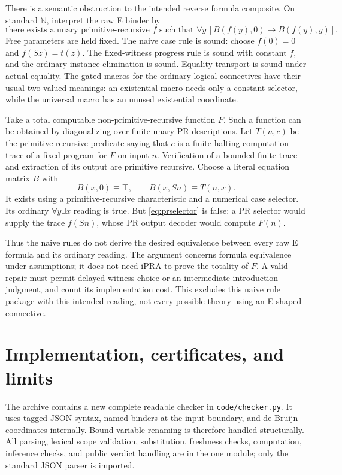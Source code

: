 \documentclass[11pt,letterpaper]{article}
\theoremstyle{definition}\newtheorem{definition}[theorem]{Definition}
\theoremstyle{remark}\newtheorem{remark}[theorem]{Remark}
\newcommand{\file}[1]{{\small\nolinkurl{#1}}}
\begin{document}
There is a semantic obstruction to the intended reverse formula
composite. On standard $\mathbb N$, interpret the raw E binder by
\[
 \text{there exists a unary primitive-recursive }f\text{ such that }
 \forall y\,[B(f(y),0)\to B(f(y),y)].
 \tag{PR-selector reading}\label{eq:prselector}
\]
Free parameters are held fixed. The naive case rule is sound: choose
$f(0)=0$ and $f(Sz)=t(z)$. The fixed-witness progress rule is sound
with constant $f$, and the ordinary instance elimination is sound.
Equality transport is sound under actual equality. The gated macros
for the ordinary logical connectives have their usual two-valued
meanings: an existential macro needs only a constant selector, while
the universal macro has an unused existential coordinate.

Take a total computable non-primitive-recursive function $F$. Such a
function can be obtained by diagonalizing over finite unary PR
descriptions. Let $T(n,c)$ be the primitive-recursive predicate saying
that $c$ is a finite halting computation trace of a fixed program for
$F$ on input $n$. Verification of a bounded finite trace and extraction
of its output are primitive recursive. Choose a literal equation matrix
$B$ with
\[
        B(x,0)\equiv\top,\qquad B(x,Sn)\equiv T(n,x).
\]
It exists using a primitive-recursive characteristic and a numerical
case selector. Its ordinary $\forall y\exists x$ reading is true.
But \eqref{eq:prselector} is false: a PR selector would supply the
trace $f(Sn)$, whose PR output decoder would compute $F(n)$.

Thus the naive rules do not derive the desired equivalence between
every raw E formula and its ordinary reading. The argument concerns
formula equivalence under assumptions; it does not need iPRA to prove
the totality of $F$. A valid repair must permit delayed witness choice
or an intermediate introduction judgment, and count its implementation
cost. This excludes this naive rule package with this intended reading,
not every possible theory using an E-shaped connective.

\section{Implementation, certificates, and limits}
\label{sec:implementation}

The archive contains a new complete readable checker in
\file{code/checker.py}. It uses tagged JSON syntax, named binders at the
input boundary, and de Bruijn coordinates internally. Bound-variable
renaming is therefore handled structurally. All parsing, lexical scope
validation, substitution, freshness checks, computation, inference
checks, and public verdict handling are in the one module; only the
standard JSON parser is imported.
\end{document}
